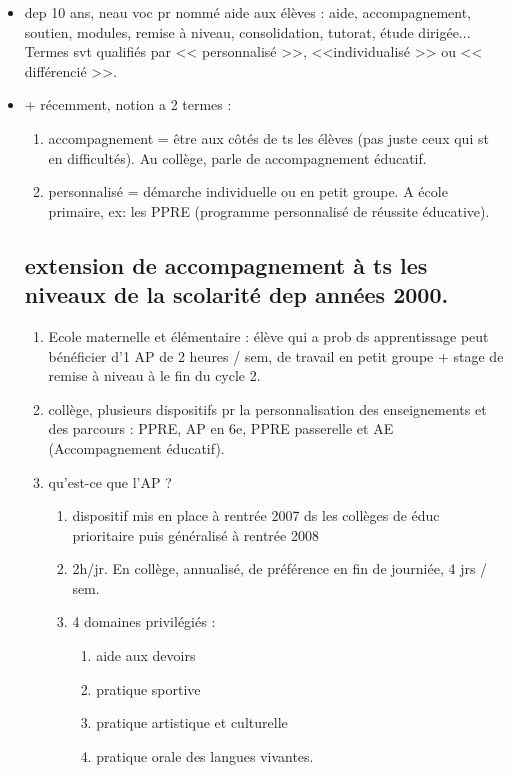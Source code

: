 \documentclass[12pt]{report}
\begin{document}
\begin{itemize}
\item dep 10 ans, neau voc pr nommé aide aux élèves : aide, accompagnement, soutien, modules, remise à niveau, consolidation, tutorat, étude dirigée... Termes svt qualifiés par << personnalisé >>, <<individualisé >> ou << différencié >>.\\
\item + récemment, notion a 2 termes : 
\begin{enumerate}
 \item accompagnement = être aux côtés de ts les élèves (pas juste ceux qui st en difficultés). Au collège, parle de accompagnement éducatif.\\
 \item personnalisé = démarche individuelle ou en petit groupe. A école primaire, ex: les PPRE (programme personnalisé de réussite éducative).\\
\end{enumerate}

\subsection{extension de accompagnement à ts les niveaux de la scolarité dep années 2000.}
\begin{enumerate}
\item Ecole maternelle et élémentaire :  élève qui a prob ds apprentissage peut bénéficier d'1 AP de 2 heures / sem, de travail en petit groupe + stage de remise à niveau à le fin du cycle 2.\\
\item collège, plusieurs dispositifs pr la personnalisation des enseignements et des parcours : PPRE, AP en 6e, PPRE passerelle et AE (Accompagnement éducatif). \\

\item qu'est-ce que l'AP ? \\

\begin{enumerate}
\item dispositif mis en place à rentrée 2007 ds les collèges de éduc prioritaire puis généralisé à rentrée 2008 \\

\item 2h/jr. En collège, annualisé, de préférence en fin de journiée, 4 jrs / sem. \\

\item 4 domaines privilégiés : 
\begin{enumerate}
\item aide aux devoirs
\item  pratique sportive
\item pratique artistique et culturelle
\item  pratique orale des langues vivantes.
\end{enumerate}
\end{enumerate}
\end{enumerate}


\end{itemize}
\end{document}
